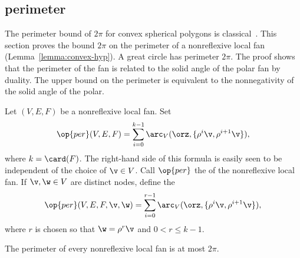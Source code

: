 \subsection{perimeter}

The perimeter bound of $2\pi$ for convex spherical polygons is
classical~\cite[p.~100]{vanderWaerden:1951}.   This
section proves the bound $2\pi$ on the perimeter of a nonreflexive
local fan (Lemma~\ref{lemma:convex-hyp}).  A great circle has
perimeter $2\pi$.  The proof shows that the perimeter of the
fan is related to the solid angle of the polar fan by duality.
The upper bound on the perimeter is equivalent to the nonnegativity
of the solid angle of the polar.


\begin{definition}[perimeter]\label{lemma:perim}
Let $(V,E,F)$ be a nonreflexive local fan.    Set
\[ 
  \op{per}(V,E,F) 
= \sum_{i=0}^{k-1} \arc_V(\orz,\{\rho^i \v,\rho^{i+1} \v\}), 
\] 
where $k=\card(F)$.  The right-hand side of this formula is easily
seen to be independent of the choice of $\v\in V$.  Call $\op{per}$
the  of the nonreflexive local fan.  If $\v,\w\in V$ are
distinct nodes, define the 
\[ 
  \op{per}(V,E,F,\v,\w) 
= \sum_{i=0}^{r-1} \arc_V(\orz,\{\rho^i \v,\rho^{i+1} \v\}), 
\] 
where $r$ is chosen so that $\w=\rho^r \v$ and $0<r\le k-1$.
\end{definition}
%
%
%



\begin{lemma} %
\label{lemma:convex-hyp}
The perimeter of every nonreflexive local fan is at most $2\pi$.  
\end{lemma}
%
%

